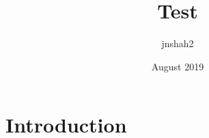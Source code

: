 \documentclass{article}
\title{Test}
\author{jnshah2 }
\date{August 2019}
\begin{document}
\maketitle

\section{Introduction}
\end{document}
